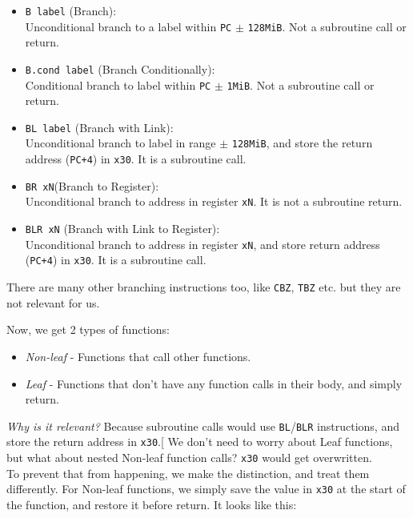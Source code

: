 \documentclass[a4paper, nobind]{templates/ociamthesis}
\providecommand{\tightlist}{%
  \setlength{\itemsep}{0pt}\setlength{\parskip}{0pt}}
\begin{document}
\begin{itemize}
\tightlist
\item
  \texttt{B\ label} (Branch):\\
  Unconditional branch to a label within \texttt{PC} \(\pm\) \texttt{128MiB}.
  Not a subroutine call or return.
\item
  \texttt{B.cond\ label} (Branch Conditionally):\\
  Conditional branch to label within \texttt{PC} \(\pm\) \texttt{1MiB}.
  Not a subroutine call or return.
\item
  \texttt{BL\ label} (Branch with Link):\\
  Unconditional branch to label in range \(\pm\) \texttt{128MiB},
  and store the return address (\texttt{PC+4}) in \texttt{x30}.
  It is a subroutine call.
\item
  \texttt{BR\ xN}(Branch to Register):\\
  Unconditional branch to address in register \texttt{xN}.
  It is not a subroutine return.
\item
  \texttt{BLR\ xN} (Branch with Link to Register):\\
  Unconditional branch to address in register \texttt{xN},
  and store return address (\texttt{PC+4}) in \texttt{x30}.
  It is a subroutine call.
\end{itemize}

There are many other branching instructions too, like \texttt{CBZ}, \texttt{TBZ} etc.
but they are not relevant for us.

Now, we get 2 types of functions:

\begin{itemize}
\tightlist
\item
  \emph{Non-leaf} - Functions that call other functions.
\item
  \emph{Leaf} - Functions that don't have any function calls in their body, and simply return.
\end{itemize}

\emph{Why is it relevant?}
Because subroutine calls would use \texttt{BL}/\texttt{BLR} instructions,
and store the return address in \texttt{x30}.{[}\citeproc{ref-arm-arch-manual}{6}{]}
We don't need to worry about Leaf functions,
but what about nested Non-leaf function calls? \texttt{x30} would get overwritten.\\
To prevent that from happening, we make the distinction, and treat them differently.
For Non-leaf functions, we simply save the value in \texttt{x30} at the start of the function,
and restore it before return. It looks like this:
\end{document}
